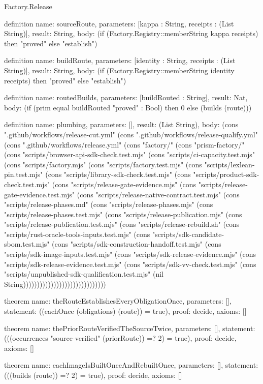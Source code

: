 \begin{lexlean}{Factory.Release}
\begin{semanticmodule}
definition{
  name: sourceRoute,
  parameters: [kappa : String, receipts : (List String)],
  result: String,
  body: (if (Factory.Registry::memberString kappa receipts) then "proved" else "establish")
}

definition{
  name: buildRoute,
  parameters: [identity : String, receipts : (List String)],
  result: String,
  body: (if (Factory.Registry::memberString identity receipts) then "proved" else "establish")
}

definition{
  name: routedBuilds,
  parameters: [buildRouted : String],
  result: Nat,
  body: (if (prim equal buildRouted "proved" : Bool) then 0 else (builds (route)))
}

definition{
  name: plumbing,
  parameters: [],
  result: (List String),
  body: (cons ".github/workflows/release-cut.yml" (cons ".github/workflows/release-qualify.yml" (cons ".github/workflows/release.yml" (cons "factory/" (cons "prism-factory/" (cons "scripts/browser-api-sdk-check.test.mjs" (cons "scripts/ci-capacity.test.mjs" (cons "scripts/factory.mjs" (cons "scripts/factory.test.mjs" (cons "scripts/lexlean-pin.test.mjs" (cons "scripts/library-sdk-check.test.mjs" (cons "scripts/product-sdk-check.test.mjs" (cons "scripts/release-gate-evidence.mjs" (cons "scripts/release-gate-evidence.test.mjs" (cons "scripts/release-native-contract.test.mjs" (cons "scripts/release-phases.md" (cons "scripts/release-phases.mjs" (cons "scripts/release-phases.test.mjs" (cons "scripts/release-publication.mjs" (cons "scripts/release-publication.test.mjs" (cons "scripts/release-rebuild.sh" (cons "scripts/rust-oracle-tools-inputs.test.mjs" (cons "scripts/sdk-candidate-sbom.test.mjs" (cons "scripts/sdk-construction-handoff.test.mjs" (cons "scripts/sdk-image-inputs.test.mjs" (cons "scripts/sdk-release-evidence.mjs" (cons "scripts/sdk-release-evidence.test.mjs" (cons "scripts/sdk-vv-check.test.mjs" (cons "scripts/unpublished-sdk-qualification.test.mjs" (nil String))))))))))))))))))))))))))))))
}

theorem{
  name: theRouteEstablishesEveryObligationOnce,
  parameters: [],
  statement: ((eachOnce (obligations) (route)) = true),
  proof: decide{},
  axioms: []
}

theorem{
  name: thePriorRouteVerifiedTheSourceTwice,
  parameters: [],
  statement: (((occurrences "source-verified" (priorRoute)) =? 2) = true),
  proof: decide{},
  axioms: []
}

theorem{
  name: eachImageIsBuiltOnceAndRebuiltOnce,
  parameters: [],
  statement: (((builds (route)) =? 2) = true),
  proof: decide{},
  axioms: []
}


\end{semanticmodule}
\end{lexlean}

